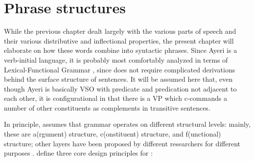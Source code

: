 
\chapter{Phrase structures}

While the previous chapter dealt largely with the various parts of speech and 
their various distributive and inflectional properties, the present chapter 
will elaborate on how these words combine into syntactic phrases. Since Ayeri 
is a verb-initial language, it is probably most comfortably analyzed in terms 
of Lexical-Functional Grammar \citep{bresnan2016}, since \lfg{} does not 
require complicated derivations behind the surface structure of sentences. It 
will be assumed here that, even though Ayeri is basically VSO with predicate 
and predication not adjacent to each other, it is configurational in that there 
is a VP which c-commands a number of other constituents as complements in 
transitive sentences.

In principle, \lfg{} assumes that grammar operates on different structural 
levels: mainly, these are a(rgument) structure, c(onstituent) structure, and 
f(unctional) structure; other layers have been proposed by different 
researchers for different purposes \citep[862--865]{buttking2015}. 
\citet{bresnan2016} define three core design principles for \lfg{}:

